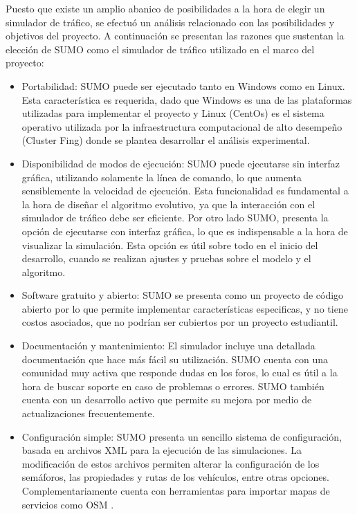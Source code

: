 Puesto que existe un amplio abanico de posibilidades a la hora de elegir un simulador de tráfico, se efectuó un análisis relacionado con las posibilidades y objetivos del proyecto. A continuación se presentan las razones que sustentan la elección de SUMO como el simulador de tráfico utilizado en el marco del proyecto:

\begin{itemize}
	\item Portabilidad: SUMO puede ser ejecutado tanto en Windows como en Linux. Esta característica es requerida, dado que Windows es una de las plataformas utilizadas para implementar el proyecto y Linux (CentOs) es el sistema operativo utilizada por la infraestructura computacional de alto desempeño (Cluster Fing) donde se plantea desarrollar el análisis experimental.
	
	\item Disponibilidad de modos de ejecución: SUMO puede ejecutarse sin interfaz gráfica, utilizando solamente la línea de comando, lo que aumenta sensiblemente la velocidad de ejecución. Esta funcionalidad es fundamental a la hora de diseñar el algoritmo evolutivo, ya que la interacción con el simulador de tráfico debe ser eficiente. Por otro lado SUMO, presenta la opción de ejecutarse con interfaz gráfica, lo que es indispensable a la hora de visualizar la simulación. Esta opción es útil sobre todo en el inicio del desarrollo, cuando se realizan ajustes y pruebas sobre el modelo y el algoritmo.
	
	\item Software gratuito y abierto: SUMO se presenta como un proyecto de código abierto por lo que permite implementar características especificas, y no tiene costos asociados, que no podrían ser cubiertos por un proyecto estudiantil. 
	
	\item Documentación y mantenimiento: El simulador incluye una detallada documentación que hace más fácil su utilización. SUMO cuenta con una comunidad muy activa que responde dudas en los foros, lo cual es útil a la hora de buscar soporte en caso de problemas o errores. SUMO también cuenta con un desarrollo activo que permite su mejora por medio de actualizaciones frecuentemente.
	
	\item Configuración simple: SUMO presenta un sencillo sistema de configuración, basada en archivos XML para la ejecución de las simulaciones. La modificación de estos archivos permiten alterar la configuración de los semáforos, las propiedades y rutas de los vehículos, entre otras opciones. Complementariamente cuenta con herramientas para importar mapas de servicios como OSM \citep{OSM}.
	

\end{itemize}
